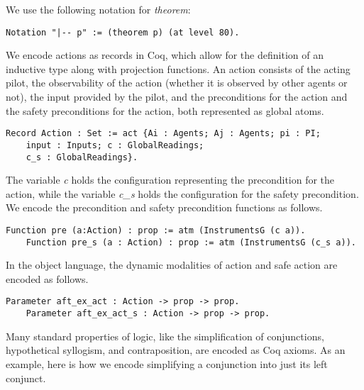 We use the following notation for \emph{theorem}:
\begin{tcolorbox}	\begin{lstlisting}[language=Coq]
	Notation "|-- p" := (theorem p) (at level 80).
	\end{lstlisting}
\end{tcolorbox}
We encode actions as records in Coq, which allow for the definition of an inductive type along with projection functions. An action consists of the acting pilot, the observability of the action (whether it is observed by other agents or not), the input provided by the pilot, and the preconditions for the action and the safety preconditions for the action, both represented as global atoms.
\begin{tcolorbox}
	\begin{lstlisting}[language=Coq]
	Record Action : Set := act {Ai : Agents; Aj : Agents; pi : PI; 
	input : Inputs; c : GlobalReadings; 
	c_s : GlobalReadings}.
	\end{lstlisting}
\end{tcolorbox}
The variable \emph{c} holds the configuration representing the precondition for the action, while the variable \emph{c\_s} holds the configuration for the safety precondition.
We encode the precondition and safety precondition functions as follows.
\begin{tcolorbox}
	\begin{lstlisting}[language=Coq]
	Function pre (a:Action) : prop := atm (InstrumentsG (c a)).
	Function pre_s (a : Action) : prop := atm (InstrumentsG (c_s a)).
	\end{lstlisting}
\end{tcolorbox}
In the object language, the dynamic modalities of action and safe action are encoded as follows.
\begin{tcolorbox}\begin{lstlisting}[language=Coq]
	Parameter aft_ex_act : Action -> prop -> prop.
	Parameter aft_ex_act_s : Action -> prop -> prop.
	\end{lstlisting}
\end{tcolorbox}
Many standard properties of logic, like the simplification of conjunctions, hypothetical syllogism, and contraposition, are encoded as Coq axioms. As an example, here is how we encode simplifying a conjunction into just its left conjunct.
